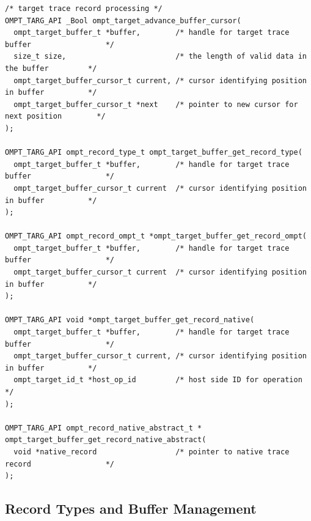 \documentclass{article}
\begin{document}
\begin{lstlisting}
/* target trace record processing */
OMPT_TARG_API _Bool ompt_target_advance_buffer_cursor(
  ompt_target_buffer_t *buffer,        /* handle for target trace buffer                 */
  size_t size,                         /* the length of valid data in the buffer         */
  ompt_target_buffer_cursor_t current, /* cursor identifying position in buffer          */
  ompt_target_buffer_cursor_t *next    /* pointer to new cursor for next position        */
);

OMPT_TARG_API ompt_record_type_t ompt_target_buffer_get_record_type(
  ompt_target_buffer_t *buffer,        /* handle for target trace buffer                 */
  ompt_target_buffer_cursor_t current  /* cursor identifying position in buffer          */
);

OMPT_TARG_API ompt_record_ompt_t *ompt_target_buffer_get_record_ompt(
  ompt_target_buffer_t *buffer,        /* handle for target trace buffer                 */
  ompt_target_buffer_cursor_t current  /* cursor identifying position in buffer          */
);

OMPT_TARG_API void *ompt_target_buffer_get_record_native(
  ompt_target_buffer_t *buffer,        /* handle for target trace buffer                 */
  ompt_target_buffer_cursor_t current, /* cursor identifying position in buffer          */
  ompt_target_id_t *host_op_id         /* host side ID for operation                     */
);

OMPT_TARG_API ompt_record_native_abstract_t *
ompt_target_buffer_get_record_native_abstract(
  void *native_record                  /* pointer to native trace record                 */
);\end{lstlisting} 

\clearpage  
\subsection{Record Types and Buffer Management}
\label{appendix:ompt-records}
\end{document}

